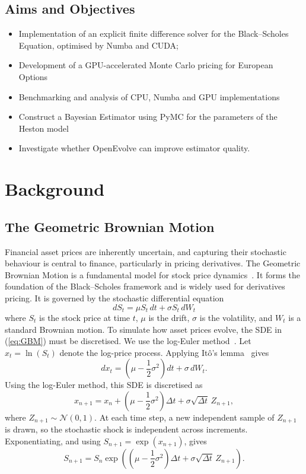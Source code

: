 \documentclass[11pt]{report}
\begin{document}
\section{Aims and Objectives}
\begin{itemize}
    \item Implementation of an explicit finite difference solver for the Black--Scholes Equation,
    optimised by Numba and CUDA;
    \item Development of a GPU-accelerated Monte Carlo pricing for European Options
    \item Benchmarking and analysis of CPU, Numba and GPU implementations
    \item Construct a Bayesian Estimator using PyMC for the parameters
    of the Heston model
    \item Investigate whether OpenEvolve can improve estimator quality.
\end{itemize}
\chapter{Background}\label{chap:bg}
\section{The Geometric Brownian Motion}
Financial asset prices are inherently uncertain, and capturing their stochastic behaviour is central to finance, particularly in pricing derivatives. 
The Geometric Brownian Motion is a fundamental model for stock price dynamics~\cite{alma991001559369708046}. It forms the foundation of the Black--Scholes framework and is widely used for derivatives pricing. It is governed by the stochastic differential equation
\begin{equation}
    dS_t = \mu S_t\,dt + \sigma S_t\,dW_t
    \label{eq:GBM}
\end{equation}
where $S_t$ is the stock price at time $t$, $\mu$ is the drift, $\sigma$ is the volatility, and $W_t$ is a standard Brownian motion.
To simulate how asset prices evolve, the SDE in (\ref{eq:GBM}) must be discretised. We use the log-Euler method~\cite{alma991003696519708046}. Let $x_t = \ln(S_t)$ denote the log-price process. Applying It\^o's lemma~\cite{alma991008758143208046} gives
\begin{equation}
  dx_t = \left(\mu - \frac{1}{2}\sigma^2\right)dt + \sigma\,dW_t.
\end{equation}
Using the log-Euler method, this SDE is discretised as
\begin{equation}
  x_{n+1} = x_n + \left(\mu - \frac{1}{2}\sigma^2\right)\Delta t + \sigma\sqrt{\Delta t}\,Z_{n+1},
\end{equation}
where $Z_{n+1} \sim \mathcal{N}(0,1)$. At each time step, a new independent sample of $Z_{n+1}$ is drawn, so the stochastic shock is independent across increments. Exponentiating, and using $S_{n+1} = \exp(x_{n+1})$, gives
\begin{equation}
  S_{n+1} = S_n \exp\left(\left(\mu - \frac{1}{2}\sigma^2\right)\Delta t + \sigma\sqrt{\Delta t}\,Z_{n+1}\right).
  \label{eq:discGBM}
\end{equation}
\end{document}
